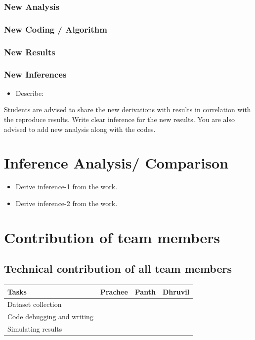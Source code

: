 \documentclass{article}
\begin{document}
\subsubsection{New Analysis}

\subsubsection{New Coding / Algorithm}

\subsubsection{New Results}

\subsubsection{New Inferences}
\begin{itemize}
    \item Describe:
\end{itemize}

Students are advised to share the new derivations with results in correlation with the  reproduce results. Write clear inference for the new results. You are also advised to add new analysis along with the codes.


\section{Inference Analysis/ Comparison}

\begin{itemize}

\item Derive inference-1 from the work.

\item Derive inference-2 from the work.
\end{itemize}

\section{ Contribution of team members}
\subsection{Technical contribution of all team members }
\begin{table}[h]
\centering
\begin{tabular}{|l|l|l|l|}
\hline
Tasks              & Prachee       & Panth         & Dhruvil \\ \hline
Dataset collection &               &               &         \\ \hline
Code debugging and writing     &               &               &         \\ \hline
Simulating results &               &               &         \\ \hline
\end{tabular}
\end{table}
\end{document}
